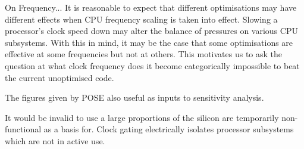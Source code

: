 


On Frequency...
It is reasonable to expect that different optimisations may have different effects when CPU frequency scaling is taken into effect. Slowing a processor's clock speed down may alter the balance of pressures on various CPU subsystems. With this in mind, it may be the case that some optimisations are effective at some frequencies but not at others. This motivates us to ask the question at what clock frequency does it become categorically impossible to beat the current unoptimised code.

The figures given by POSE also useful as inputs to sensitivity analysis.






It would be invalid to use a large proportions of the silicon are temporarily non-functional as a basis for. 
Clock gating electrically isolates processor subsystems which are not in active use.


